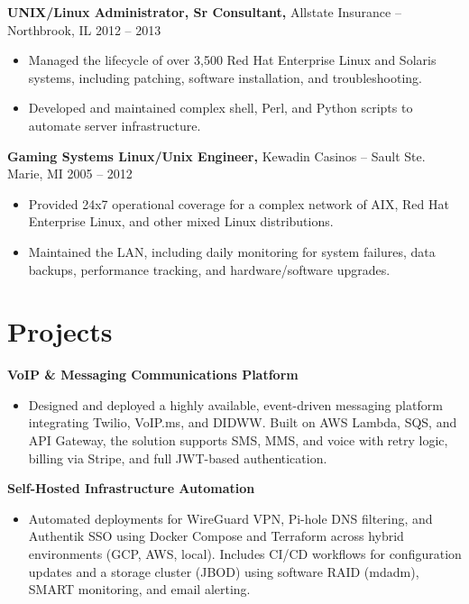 \documentclass[11pt]{article}
\begin{document}
{\large\textbf{UNIX/Linux Administrator, Sr Consultant,}} {Allstate Insurance} -- Northbrook, IL \hfill 2012 -- 2013 \\
\vspace{-9pt}
\begin{itemize}
    \item Managed the lifecycle of over 3,500 Red Hat Enterprise Linux and Solaris systems, including patching, software installation, and troubleshooting.
    \item Developed and maintained complex shell, Perl, and Python scripts to automate server infrastructure.
\end{itemize}

{\large\textbf{Gaming Systems Linux/Unix Engineer,}} {Kewadin Casinos} -- Sault Ste. Marie, MI \hfill 2005 -- 2012 \\
\vspace{-9pt}
\begin{itemize}
    \item Provided 24x7 operational coverage for a complex network of AIX, Red Hat Enterprise Linux, and other mixed Linux distributions.
    \item Maintained the LAN, including daily monitoring for system failures, data backups, performance tracking, and hardware/software upgrades.
\end{itemize}

\vspace{-18.5pt}

\section*{Projects}
{\large\textbf{VoIP \& Messaging Communications Platform}} \\
\vspace{-9pt}
\begin{itemize}
  \item Designed and deployed a highly available, event-driven messaging platform integrating Twilio, VoIP.ms, and DIDWW. Built on AWS Lambda, SQS, and API Gateway, the solution supports SMS, MMS, and voice with retry logic, billing via Stripe, and full JWT-based authentication.
\end{itemize}

{\large\textbf{Self-Hosted Infrastructure Automation}} \\
\vspace{-9pt}
\begin{itemize}
  \item Automated deployments for WireGuard VPN, Pi-hole DNS filtering, and Authentik SSO using Docker Compose and Terraform across hybrid environments (GCP, AWS, local). Includes CI/CD workflows for configuration updates and a storage cluster (JBOD) using software RAID (mdadm), SMART monitoring, and email alerting.
\end{itemize}
\end{document}

